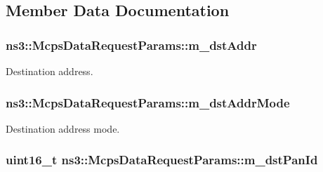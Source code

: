 \subsection{Member Data Documentation}
\subsubsection[{\texorpdfstring{m\+\_\+dst\+Addr}{m_dstAddr}}]{ ns3\+::\+Mcps\+Data\+Request\+Params\+::m\+\_\+dst\+Addr}\hypertarget{structns3_1_1McpsDataRequestParams_a68e918ac117d0fe43d6b9541ae4347c5}{}\label{structns3_1_1McpsDataRequestParams_a68e918ac117d0fe43d6b9541ae4347c5}


Destination address. 

\subsubsection[{\texorpdfstring{m\+\_\+dst\+Addr\+Mode}{m_dstAddrMode}}]{ ns3\+::\+Mcps\+Data\+Request\+Params\+::m\+\_\+dst\+Addr\+Mode}\hypertarget{structns3_1_1McpsDataRequestParams_a5c5e8dd4d08bfcd24de430d38ea7cd78}{}\label{structns3_1_1McpsDataRequestParams_a5c5e8dd4d08bfcd24de430d38ea7cd78}


Destination address mode. 

\subsubsection[{\texorpdfstring{m\+\_\+dst\+Pan\+Id}{m_dstPanId}}]{\setlength{\rightskip}{0pt plus 5cm}uint16\+\_\+t ns3\+::\+Mcps\+Data\+Request\+Params\+::m\+\_\+dst\+Pan\+Id}\hypertarget{structns3_1_1McpsDataRequestParams_a6695c180dec55fbd39f883052040e003}{}\label{structns3_1_1McpsDataRequestParams_a6695c180dec55fbd39f883052040e003}


